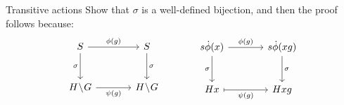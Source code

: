 \documentclass[8pt, handout]{beamer}
\begin{document}
\begin{frame}{Transitive actions}
  Show that $\sigma$ is a well-defined bijection, and then the proof
  follows because:
  \[
  \begin{tikzcd}[column sep=large,row sep=large,ampersand replacement=\&]
    S \arrow{r}{\phi(g)} \arrow{d}[swap]{\sigma} \& S \arrow{d}{\sigma} \\   
    H\!\setminus\!G \arrow[swap]{r}{\psi(g)} \& H\!\setminus\!G
  \end{tikzcd}
  \hspace{12mm}
  \begin{tikzcd}[column sep=large,row sep=large,ampersand replacement=\&]
    s\Dot\phi(x) \arrow{r}[mapsto]{\phi(g)} \arrow{d}[swap,mapsto]{\sigma} \&
    s\Dot\phi(xg) \arrow{d}[mapsto]{\sigma} \\   
    Hx \arrow[swap,mapsto]{r}{\psi(g)} \& Hxg
  \end{tikzcd}
  \]
  
\end{frame}

\end{document}
